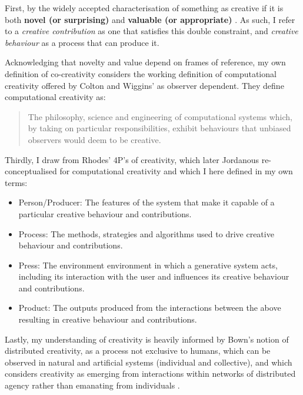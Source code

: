 First, by the widely accepted characterisation of something as creative if it is both \textbf{novel (or surprising)} and \textbf{valuable (or appropriate)} \cite{Amabile1983-lj, Sternberg1998-oz, Runco2012-mk, Boden2003-hk}. As such, I refer to a \textit{creative contribution} as one that satisfies this double constraint, and \textit{creative behaviour} as a process that can produce it. 

Acknowledging that novelty and value depend on frames of reference, my own definition of co-creativity considers the working definition of computational creativity offered by Colton and Wiggins' \cite{Colton2021-bt} as observer dependent.  They define computational creativity as:

\begin{quote}
The philosophy, science and engineering of computational systems which, by taking on particular responsibilities, exhibit behaviours that unbiased observers would deem to be creative.
\end{quote}
 
Thirdly, I draw from Rhodes' \cite{Rhodes1961-od} 4P's of creativity, which later Jordanous re-conceptualised for computational creativity \cite{Jordanous2016-xb} and which I here defined in my own terms: 

\begin{itemize}
    \item Person/Producer: The features of the system that make it capable of a particular creative behaviour and contributions.
    \item Process: The methods, strategies and algorithms used to drive creative behaviour and contributions.
    \item Press: The environment environment in which a generative system acts, including its interaction with the user and influences its creative behaviour and contributions.
    \item Product: The outputs produced from the interactions between the above resulting in creative behaviour and contributions.
\end{itemize}

Lastly, my understanding of creativity is heavily informed by Bown's notion of distributed creativity, as a process not exclusive to humans, which can be observed in natural and artificial systems (individual and collective), and which considers creativity as emerging from interactions within networks of distributed agency rather than emanating from individuals \cite{Bown2012-gg, Bown2021-os}. 

